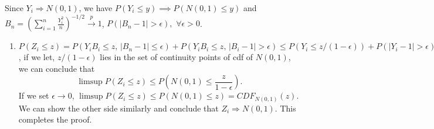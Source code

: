 \documentclass{article}
\begin{document}
Since $Y_i \Rightarrow N(0, 1)$, we have $P(Y_i \leq y) \implies P(N(0, 1) \leq y)$ and $B_n = \left(\sum_{i=1}^{n} \frac{Y_i^2}{n}\right)^{-1/2} \xrightarrow{p} 1$, $P(|B_n - 1| > \epsilon), \, \, \forall \epsilon > 0$. 
\begin{enumerate}
    \item $P(Z_i \leq z) = P(Y_i B_i \leq z, \, |B_n -1|\leq \epsilon) + P(Y_i B_i \leq z, \, |B_i -1| > \epsilon) \leq P(Y_i \leq z/(1-\epsilon)) + P(|Y_i-1|>\epsilon)$, if we let,  $z/(1-\epsilon)$ lies in the set of continuity points of cdf of $N(0, 1)$, we can conclude that 
    \[
    \limsup{P(Z_i \leq z)} \leq P(N(0, 1) \leq \frac{z}{1-\epsilon}). 
    \]
    If we set $\epsilon \rightarrow 0$, $\limsup{P(Z_i \leq z)} \leq P(N(0, 1) \leq z) = CDF_{N(0, 1)}(z)$.  We can show the other side similarly and conclude that $Z_i \Rightarrow N(0, 1)$. This completes the proof. 
\end{enumerate}
\newpage 
\printbibliography
\end{document}
